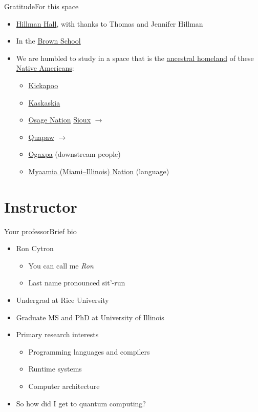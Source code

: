 \begin{frame}{Gratitude}{For this space}
\begin{itemize}
    \item \href{https://wustl.edu/about/campuses/danforth-campus/hillman-hall/}{Hillman Hall}, with thanks to Thomas and Jennifer Hillman
    \item In the \href{https://brownschool.wustl.edu/about/Pages/default.aspx}{Brown School}
    \item We are humbled to study in a space that is the \href{https://native-land.ca/resources/territory-acknowledgement/}{ancestral homeland} of these \href{https://en.wikipedia.org/wiki/Native_Americans_in_the_United_States}{Native Americans}:
    \begin{itemize}
        \item \href{https://en.wikipedia.org/wiki/Kickapoo_people}{Kickapoo}
        \item \href{https://en.wikipedia.org/wiki/Kaskaskia}{Kaskaskia}
        \item \href{https://en.wikipedia.org/wiki/Osage_Nation}{Osage Nation}
        \href{https://en.wikipedia.org/wiki/Sioux}{Sioux} $\rightarrow$
        \item \href{https://en.wikipedia.org/wiki/Quapaw}{Quapaw} $\rightarrow$
        \item \href{https://www.quapawtribe.com/401/Tribal-Name}{Ogaxpa} (downstream people)
        \item \href{https://en.wikipedia.org/wiki/Miami_people}{Myaamia (Miami--Illinois) Nation} (language)
        \end{itemize}
\end{itemize}
\end{frame}
\section{Instructor}
\begin{frame}{Your professor}{Brief bio}
\begin{itemize}
    \item Ron Cytron
    \begin{itemize}
        \item You can call me \emph{Ron}
        \item Last name pronounced sit'-run
    \end{itemize}
    \item Undergrad at Rice University
    \item Graduate MS and PhD at University of Illinois
    \item Primary research interests
    \begin{itemize}
        \item Programming languages and compilers
        \item Runtime systems
        \item Computer architecture
    \end{itemize}
    \item So how did I get to quantum computing?
\end{itemize}
    
\end{frame}

